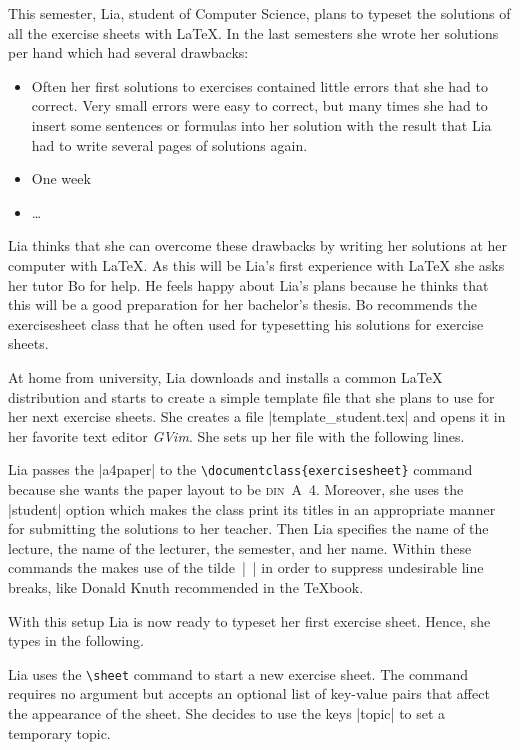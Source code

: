 \documentclass[a4paper,fleqn,9pt]{report}
\def\exercisesheet{{exercisesheet}}
\begin{document}
This semester, Lia, student of Computer Science, plans to typeset the
solutions of all the exercise sheets with \LaTeX{}. In the last
semesters she wrote her solutions per hand which had several
drawbacks:
\begin{itemize}
  \item Often her first solutions to exercises contained little errors
    that she had to correct. Very small errors were easy to correct,
    but many times she had to insert some sentences or formulas into
    her solution with the result that Lia had to write several pages
    of solutions again.
  \item One week 
  \item \ldots
\end{itemize}
Lia thinks that she can overcome these drawbacks by writing her
solutions at her computer with \LaTeX. As this will be Lia's first
experience with \LaTeX{} she asks her tutor Bo for help. He feels
happy about Lia's plans because he thinks that this will be a good
preparation for her bachelor's thesis. Bo recommends the
\exercisesheet{} class that he often used for typesetting his
solutions for exercise sheets.

At home from university, Lia downloads and installs a common \LaTeX{}
distribution and starts to create a simple template file that she
plans to use for her next exercise sheets. She creates a file 
|template_student.tex| and opens it in her
favorite text editor \emph{GVim}. She sets up her file with the
following lines.

Lia passes the |a4paper| to the
\lstinline|\documentclass{exercisesheet}| command because she wants
the paper layout to be \textsc{din}~A~4. Moreover, she uses the
|student| option which makes the class print its titles in
an appropriate manner for submitting the solutions to her teacher.
Then Lia specifies the name of the lecture, the name of the lecturer,
the semester, and her name. Within these commands the makes use of the
tilde~|~| in order to suppress undesirable line breaks, like
Donald Knuth recommended in the \TeX{}book.

With this setup Lia is now ready to typeset her first exercise sheet.
Hence, she types in the following.

Lia uses the \lstinline|\sheet| command to start a new exercise sheet.
The command requires no argument but accepts an optional list of
key-value pairs that affect the appearance of the sheet. She decides
to use the keys |topic| to set a temporary topic.
\end{document}
